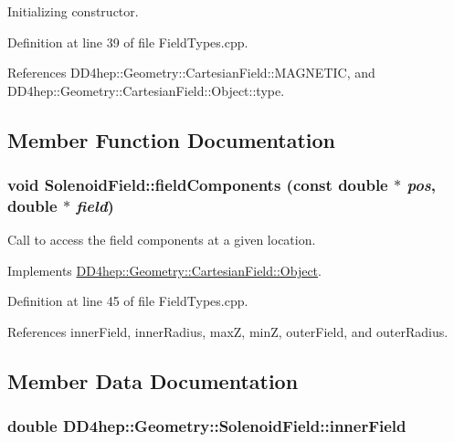 Initializing constructor. 

Definition at line 39 of file FieldTypes.cpp.

References DD4hep::Geometry::CartesianField::MAGNETIC, and DD4hep::Geometry::CartesianField::Object::type.

\subsection{Member Function Documentation}
\hypertarget{class_d_d4hep_1_1_geometry_1_1_solenoid_field_aef35ec6873e2227025d3b770bdbdc1e1}{
\subsubsection[{fieldComponents}]{\setlength{\rightskip}{0pt plus 5cm}void SolenoidField::fieldComponents (const double $\ast$ {\em pos}, \/  double $\ast$ {\em field})}}
\label{class_d_d4hep_1_1_geometry_1_1_solenoid_field_aef35ec6873e2227025d3b770bdbdc1e1}


Call to access the field components at a given location. 

Implements \hyperlink{class_d_d4hep_1_1_geometry_1_1_cartesian_field_1_1_object_ab3fa7f39545c8b0f769ee1ddfd03ed90}{DD4hep::Geometry::CartesianField::Object}.

Definition at line 45 of file FieldTypes.cpp.

References innerField, innerRadius, maxZ, minZ, outerField, and outerRadius.

\subsection{Member Data Documentation}
\hypertarget{class_d_d4hep_1_1_geometry_1_1_solenoid_field_a4f18728f3a52760c259432d4c2c6d2af}{
\subsubsection[{innerField}]{\setlength{\rightskip}{0pt plus 5cm}double {\bf DD4hep::Geometry::SolenoidField::innerField}}}
\label{class_d_d4hep_1_1_geometry_1_1_solenoid_field_a4f18728f3a52760c259432d4c2c6d2af}


